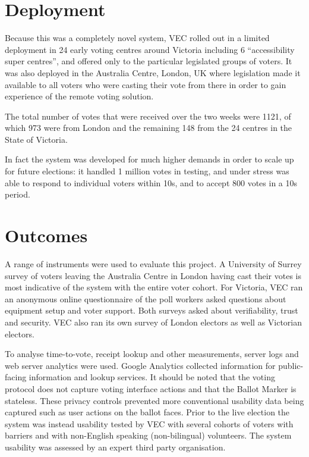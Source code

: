 \documentclass[twocolumn]{article}
\begin{document}
\section{Deployment}

Because this was a completely novel system, VEC rolled out in a limited deployment in 24 early voting centres around Victoria including 6 ``accessibility super centres'', and offered only to the particular legislated groups of voters.  It was also deployed in the Australia Centre, London, UK where legislation made it available to all voters who were casting their vote from there in order to gain experience of the remote voting solution.

The total number of votes that were received over the two weeks were 1121, of which 973 were from London and the remaining 148 from the 24 centres in the State of Victoria.   

In fact the system was developed for much higher demands in order to scale up for future elections:  it handled 1 million votes in testing, and under stress was able to respond to individual voters within 10s, and to accept 800 votes in a 10s period.  

\section{Outcomes}
A range of instruments were used to evaluate this project.  A University of Surrey survey of voters leaving the Australia Centre in London having cast their votes is most indicative of the system with the entire voter cohort.  For Victoria, VEC ran an anonymous online questionnaire of the poll workers asked questions about equipment setup and voter support.  Both surveys asked about verifiability, trust and security.  VEC also ran its own survey of London electors as well as Victorian electors.

To analyse time-to-vote, receipt lookup and other measurements, server logs and web server analytics were used.  Google Analytics collected information for public-facing information and lookup services.  It should be noted that the voting protocol does not capture voting interface actions and that the Ballot Marker is stateless.  These privacy controls prevented more conventional usability data being captured such as user actions on the ballot faces.  Prior to the live election the system was instead usability tested by VEC with several cohorts of voters with barriers and with non-English speaking (non-bilingual) volunteers.  The system usability was assessed by an expert third party organisation.
\end{document}
